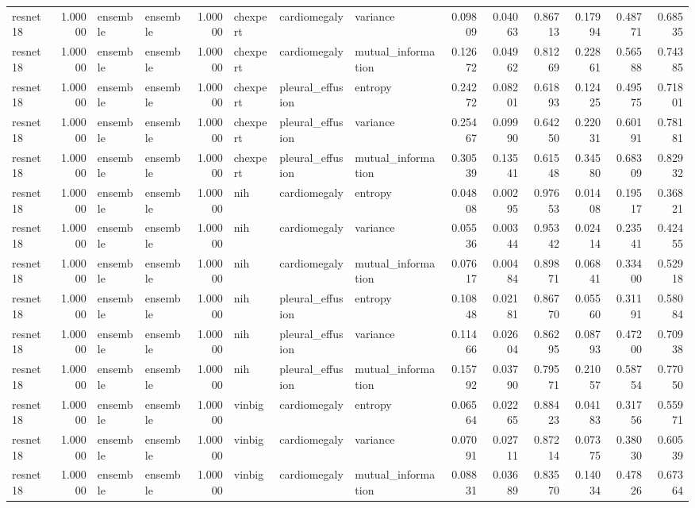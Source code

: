 \begin{tabular}{lrllrlllrrrrrr}
resnet18 & 1.00000 & ensemble & ensemble & 1.00000 & chexpert & cardiomegaly & variance & 0.09809 & 0.04063 & 0.86713 & 0.17994 & 0.48771 & 0.68535 \\
resnet18 & 1.00000 & ensemble & ensemble & 1.00000 & chexpert & cardiomegaly & mutual\_information & 0.12672 & 0.04962 & 0.81269 & 0.22861 & 0.56588 & 0.74385 \\
resnet18 & 1.00000 & ensemble & ensemble & 1.00000 & chexpert & pleural\_effusion & entropy & 0.24272 & 0.08201 & 0.61893 & 0.12425 & 0.49575 & 0.71801 \\
resnet18 & 1.00000 & ensemble & ensemble & 1.00000 & chexpert & pleural\_effusion & variance & 0.25467 & 0.09990 & 0.64250 & 0.22031 & 0.60191 & 0.78181 \\
resnet18 & 1.00000 & ensemble & ensemble & 1.00000 & chexpert & pleural\_effusion & mutual\_information & 0.30539 & 0.13541 & 0.61548 & 0.34580 & 0.68309 & 0.82932 \\
resnet18 & 1.00000 & ensemble & ensemble & 1.00000 & nih & cardiomegaly & entropy & 0.04808 & 0.00295 & 0.97653 & 0.01408 & 0.19517 & 0.36821 \\
resnet18 & 1.00000 & ensemble & ensemble & 1.00000 & nih & cardiomegaly & variance & 0.05536 & 0.00344 & 0.95342 & 0.02414 & 0.23541 & 0.42455 \\
resnet18 & 1.00000 & ensemble & ensemble & 1.00000 & nih & cardiomegaly & mutual\_information & 0.07617 & 0.00484 & 0.89871 & 0.06841 & 0.33400 & 0.52918 \\
resnet18 & 1.00000 & ensemble & ensemble & 1.00000 & nih & pleural\_effusion & entropy & 0.10848 & 0.02181 & 0.86770 & 0.05560 & 0.31191 & 0.58084 \\
resnet18 & 1.00000 & ensemble & ensemble & 1.00000 & nih & pleural\_effusion & variance & 0.11466 & 0.02604 & 0.86295 & 0.08793 & 0.47200 & 0.70938 \\
resnet18 & 1.00000 & ensemble & ensemble & 1.00000 & nih & pleural\_effusion & mutual\_information & 0.15792 & 0.03790 & 0.79571 & 0.21057 & 0.58754 & 0.77050 \\
resnet18 & 1.00000 & ensemble & ensemble & 1.00000 & vinbig & cardiomegaly & entropy & 0.06564 & 0.02265 & 0.88423 & 0.04183 & 0.31756 & 0.55971 \\
resnet18 & 1.00000 & ensemble & ensemble & 1.00000 & vinbig & cardiomegaly & variance & 0.07091 & 0.02711 & 0.87214 & 0.07375 & 0.38030 & 0.60539 \\
resnet18 & 1.00000 & ensemble & ensemble & 1.00000 & vinbig & cardiomegaly & mutual\_information & 0.08831 & 0.03689 & 0.83570 & 0.14034 & 0.47826 & 0.67364 \\

\end{tabular}
